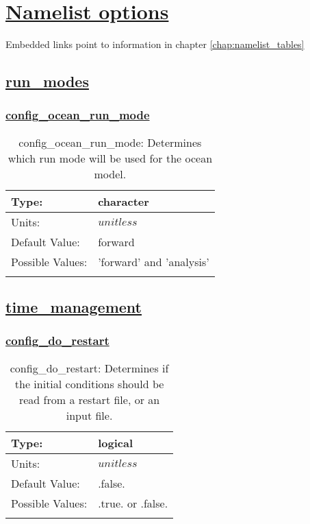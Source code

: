 \chapter[Namelist options]{\hyperref[chap:namelist_tables]{Namelist options}}
\label{chap:namelist_sections}
Embedded links point to information in chapter \ref{chap:namelist_tables}
\section[run\_modes]{\hyperref[sec:nm_tab_run_modes]{run\_modes}}
\label{sec:nm_sec_run_modes}
\subsection[config\_ocean\_run\_mode]{\hyperref[sec:nm_tab_run_modes]{config\_ocean\_run\_mode}}
\label{subsec:nm_sec_config_ocean_run_mode}
\begin{center}
\begin{longtable}{| p{2.0in} || p{4.0in} |}
    \hline
    Type: & character \\
    \hline
    Units: & $unitless$ \\
    \hline
    Default Value: & forward \\
    \hline
    Possible Values: & 'forward' and 'analysis' \\
    \hline
    \caption{config\_ocean\_run\_mode: Determines which run mode will be used for the ocean model.}
\end{longtable}
\end{center}
\section[time\_management]{\hyperref[sec:nm_tab_time_management]{time\_management}}
\label{sec:nm_sec_time_management}
\subsection[config\_do\_restart]{\hyperref[sec:nm_tab_time_management]{config\_do\_restart}}
\label{subsec:nm_sec_config_do_restart}
\begin{center}
\begin{longtable}{| p{2.0in} || p{4.0in} |}
    \hline
    Type: & logical \\
    \hline
    Units: & $unitless$ \\
    \hline
    Default Value: & .false. \\
    \hline
    Possible Values: & .true. or .false. \\
    \hline
    \caption{config\_do\_restart: Determines if the initial conditions should be read from a restart file, or an input file.}
\end{longtable}
\end{center}
